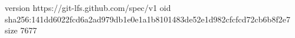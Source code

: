 version https://git-lfs.github.com/spec/v1
oid sha256:141dd6022fcd6a2ad979db1e0e1a1b8101483de52e1d982cfcfcd72cb6b8f2e7
size 7677
